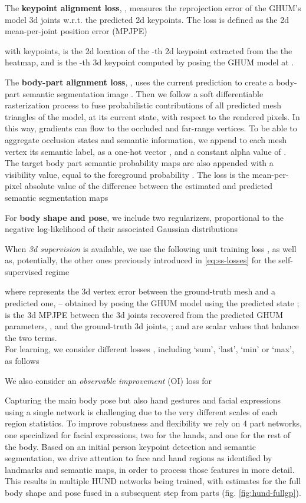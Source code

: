 \documentclass[final]{cvpr}
\begin{document}
The \textbf{keypoint alignment loss}, , measures the reprojection error of the GHUM's model 3d joints w.r.t. the predicted 2d keypoints. The loss is defined as the 2d mean-per-joint position error (MPJPE)

with  keypoints,  is the 2d location of the -th 2d keypoint extracted from the the  heatmap, and  is the -th 3d keypoint computed by posing the GHUM model at .

The \textbf{body-part alignment loss}, , uses the current prediction  to create a body-part semantic segmentation image . Then we follow a soft differentiable rasterization process\cite{liu2019soft} to fuse probabilistic contributions of all predicted mesh triangles of the model, at its current state, with respect to the rendered pixels. In this way, gradients can flow to the occluded and far-range vertices.
To be able to aggregate occlusion states and semantic information, we append to each mesh vertex its semantic label, as a one-hot vector , and a constant alpha value of . The target body part semantic probability maps  are also appended with a visibility value, equal to the foreground probability . The loss is the mean-per-pixel absolute value of the difference between the estimated and predicted semantic segmentation maps

For \textbf{body shape and pose}, we include two regularizers,  proportional to the negative log-likelihood of their associated Gaussian distributions


When \textit{3d supervision} is available, we use the following unit training loss , as well as, potentially, the other ones previously introduced 
in \eqref{eq:ss-losses}
for the self-supervised regime

where  represents the 3d vertex error between the ground-truth mesh  and a predicted one, --  obtained by posing the GHUM model using the predicted state ;  is the 3d MPJPE between the 3d joints recovered from the predicted GHUM parameters, ,  and the ground-truth 3d joints, ;  and  are scalar values that balance the two terms.\\

For learning, we consider different losses , including `sum', `last', `min' or `max', as follows

We also consider an \textit{observable improvement} (OI) loss for  \cite{hospedales2020metalearning} 


 Capturing the main body pose but also hand gestures and facial expressions using a single network is challenging due to the very different scales of each region statistics. To improve robustness and flexibility we rely on 4 part networks, one specialized for facial expressions, two for the hands, and one for the rest of the body. Based on an initial person keypoint detection and semantic segmentation, we drive attention to face and hand regions as identified by landmarks and semantic maps, in order to process those features in more detail. This results in multiple HUND networks being trained, with estimates for the full body shape and pose fused in a subsequent step from parts (fig. \ref{fig:hund-fullgp}).
\end{document}
